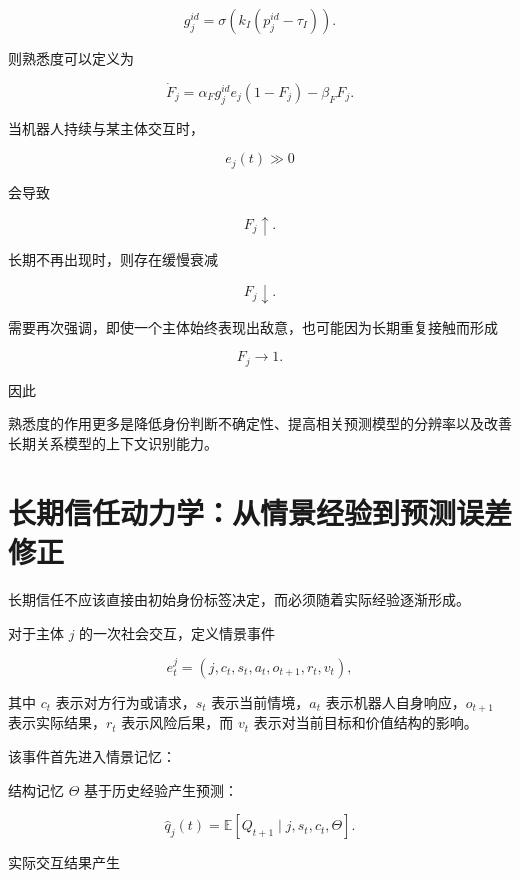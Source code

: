 \[
g_j^{id}
=
\sigma
\left(
k_I
\left(
p_j^{id}-\tau_I
\right)
\right).
\]

则熟悉度可以定义为

\[
\boxed{
\dot F_j
=
\alpha_F
g_j^{id}
e_j
(1-F_j)
-
\beta_FF_j.
}
\]

当机器人持续与某主体交互时，

\[
e_j(t)\gg0
\]

会导致

\[
F_j\uparrow.
\]

长期不再出现时，则存在缓慢衰减

\[
F_j\downarrow.
\]

需要再次强调，即使一个主体始终表现出敌意，也可能因为长期重复接触而形成

\[
F_j\rightarrow1.
\]

因此

\begin{statementbox}
\centering
{}
\end{statementbox}

熟悉度的作用更多是降低身份判断不确定性、提高相关预测模型的分辨率以及改善长期关系模型的上下文识别能力。


\section{长期信任动力学：从情景经验到预测误差修正}

长期信任不应该直接由初始身份标签决定，而必须随着实际经验逐渐形成。

对于主体 $j$ 的一次社会交互，定义情景事件

\[
e_t^j
=
\left(
j,
c_t,
s_t,
a_t,
o_{t+1},
r_t,
v_t
\right),
\]

其中 $c_t$ 表示对方行为或请求，$s_t$ 表示当前情境，$a_t$ 表示机器人自身响应，$o_{t+1}$ 表示实际结果，$r_t$ 表示风险后果，而 $v_t$ 表示对当前目标和价值结构的影响。

该事件首先进入情景记忆：

\begin{statementbox}
\centering
{}
\end{statementbox}

结构记忆 $\Theta$ 基于历史经验产生预测：

\[
\hat q_j(t)
=
\mathbb E
\left[
Q_{t+1}
\mid
j,s_t,c_t,\Theta
\right].
\]

实际交互结果产生

